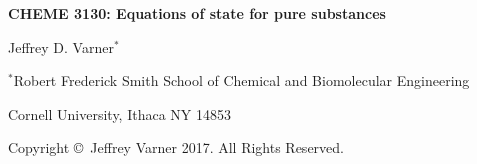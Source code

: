 \documentclass[11pt]{article}
\theoremstyle{definition}
\begin{document}
{\par\centering\textbf{\Large CHEME 3130: Equations of state for pure substances}}
\vspace{0.2in}
{\par \centering \large{Jeffrey D. Varner$^{*}$}}
\vspace{0.05in}
{\par \centering \large{$^{*}$}Robert Frederick Smith School of Chemical and Biomolecular Engineering}
{\par \centering \large{Cornell University, Ithaca NY 14853}}
\vspace{0.1in}
{\par \centering \small{Copyright \copyright\ Jeffrey Varner 2017. All Rights Reserved.}}\\

\date{}
\thispagestyle{empty}

\setcounter{page}{1}
\end{document}
